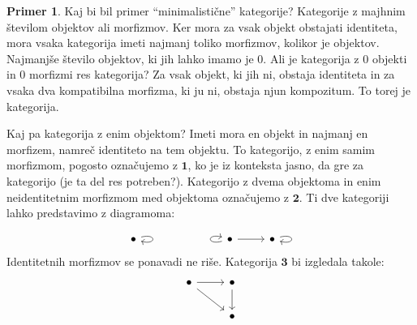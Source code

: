 \documentclass[12pt,a4paper]{book}
\theoremstyle{definition}
\theoremstyle{plain}
\theoremstyle{definition}
\newtheorem{primer}{Primer}[section]
\theoremstyle{remark}
\newcommand{\cat}[1]{\textbf{#1}}
\begin{document}
\begin{primer}
Kaj bi bil primer "`minimalistične"' kategorije? Kategorije z majhnim številom objektov ali morfizmov. Ker mora za vsak objekt obstajati identiteta, mora vsaka kategorija imeti najmanj toliko morfizmov, kolikor je objektov. Najmanjše število objektov, ki jih lahko imamo je 0. Ali je kategorija z 0 objekti in 0 morfizmi res kategorija? Za vsak objekt, ki jih ni, obstaja identiteta in za vsaka dva kompatibilna morfizma, ki ju ni, obstaja njun kompozitum. To torej je kategorija. 

Kaj pa kategorija z enim objektom? Imeti mora en objekt in najmanj en morfizem, namreč identiteto na tem objektu. To kategorijo, z enim samim morfizmom, pogosto označujemo z $\mathbf{1}$, ko je iz konteksta jasno, da gre za kategorijo (je ta del res potreben?). Kategorijo z dvema objektoma in enim neidentitetnim morfizmom med objektoma označujemo z $\mathbf{2}$. Ti dve kategoriji lahko predstavimo z diagramoma:

\begin{equation}
\begin{tikzcd}
\bullet \arrow[loop right] &&&  \arrow[loop left] \bullet \arrow[r] & \bullet \arrow[loop right]
\end{tikzcd}
\end{equation}
%
Identitetnih morfizmov se ponavadi ne riše. Kategorija $\cat{3}$ bi izgledala takole:
%
\begin{equation}
\begin{tikzcd}
\bullet \arrow[r] \arrow[rd] & \bullet \arrow[d] \\
& \bullet
\end{tikzcd}
\end{equation}
\end{primer}
\end{document}
